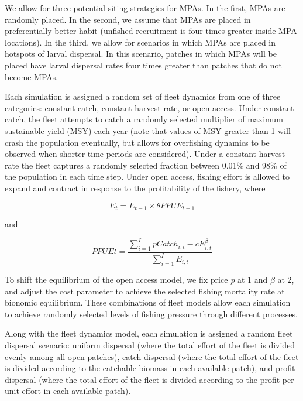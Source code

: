 \documentclass[9pt,twocolumn,twoside,lineno]{pnas-new}
\begin{document}
We allow for three potential siting strategies for MPAs. In the first,
MPAs are randomly placed. In the second, we assume that MPAs are placed
in preferentially better habit (unfished recruitment is four times
greater inside MPA locations). In the third, we allow for scenarios in
which MPAs are placed in hotspots of larval dispersal. In this scenario,
patches in which MPAs will be placed have larval dispersal rates four
times greater than patches that do not become MPAs.

Each simulation is assigned a random set of fleet dynamics from one of
three categories: constant-catch, constant harvest rate, or open-access.
Under constant-catch, the fleet attempts to catch a randomly selected
multiplier of maximum sustainable yield (MSY) each year (note that
values of MSY greater than 1 will crash the population eventually, but
allows for overfishing dynamics to be observed when shorter time periods
are considered). Under a constant harvest rate the fleet captures a
randomly selected fraction between 0.01\% and 98\% of the population in
each time step. Under open access, fishing effort is allowed to expand
and contract in response to the profitability of the fishery, where

\begin{equation}
  E_{t} = E_{t-1}\times\theta{PPUE_{t-1}}
  \label{eqn:oa}
\end{equation}

and

\begin{equation}
  PPUE{t} = \frac{\sum_{i=1}^{I}pCatch_{i,t} - cE_{i,t}^\beta}{\sum_{i=1}^I E_{i,t}}
  \label{eqn:profits}
\end{equation}

To shift the equilibrium of the open access model, we fix price \emph{p}
at 1 and \(\beta\) at 2, and adjust the cost parameter to achieve the
selected fishing mortality rate at bionomic equilibrium. These
combinations of fleet models allow each simulation to achieve randomly
selected levels of fishing pressure through different processes.

Along with the fleet dynamics model, each simulation is assigned a
random fleet dispersal scenario: uniform dispersal (where the total
effort of the fleet is divided evenly among all open patches), catch
dispersal (where the total effort of the fleet is divided according to
the catchable biomass in each available patch), and profit dispersal
(where the total effort of the fleet is divided according to the profit
per unit effort in each available patch).
\end{document}

